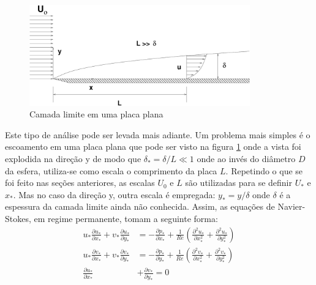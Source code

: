 \documentclass[article,12pt,oneside,a4paper,english,brazil,sumario=tradicional]{abntex2}
\begin{document}
\begin{figure}
\centering
\includegraphics[width=0.85\textwidth]{./figuras/camada-limite.pdf}
\caption{Camada limite em uma placa plana}
\label{fig:blayer}
\end{figure}

Este tipo de análise pode ser levada mais adiante. Um problema mais simples é o escoamento em uma placa plana que pode ser visto na figura \ref{fig:blayer} onde a vista foi explodida na direção y de modo que $\delta_* = \delta/L \ll 1$ onde ao invés do diâmetro $D$ da esfera, utiliza-se como escala o comprimento da placa $L$. Repetindo o que se foi feito nas seções anteriores, as escalas $U_0$ e $L$ são utilizadas para se definir $U_*$ e $x_*$. Mas no caso da direção y, outra escala é empregada: $y_* = y / \delta$ onde $\delta$ é a espessura da camada limite ainda não conhecida. Assim, as equações de Navier-Stokes, em regime permanente, tomam a seguinte forma:
\begin{align}
 u_*\frac{\partial u_*}{\partial x_*} + v_*\frac{\partial u_*}{\partial y_*} &= 
-\frac{\partial p_*}{\partial x_*} + \frac{1}{Re} \left( \frac{\partial^2 u_*}{\partial x_*^2} + \frac{\partial^2 u_*}{\partial y_*^2}\right) \\
 u_*\frac{\partial v_*}{\partial x_*} + v_*\frac{\partial v_*}{\partial y_*} &= 
-\frac{\partial p_*}{\partial y_*} + \frac{1}{Re} \left( \frac{\partial^2 v_*}{\partial x_*^2} + \frac{\partial^2 v_*}{\partial y_*^2}\right) \\
\frac{\partial u_*}{\partial x_*} &+ \frac{\partial v_*}{\partial y_*} = 0\\
\end{align}
\end{document}
